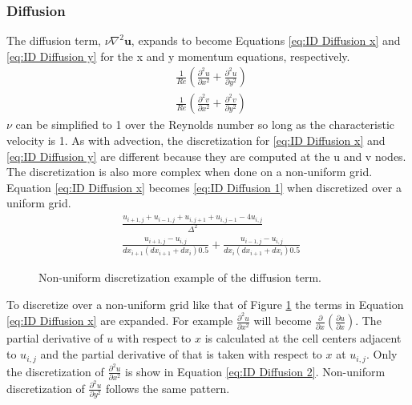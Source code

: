\subsubsection{Diffusion}
\label{sec:NS ID Diffusion}
The diffusion term, $\nu \nabla^2 \textbf{u}$, expands to become Equations \eqref{eq:ID Diffusion x} and \eqref{eq:ID Diffusion y} for the x and y momentum equations, respectively.
\begin{align}
& \frac{1}{Re}\left(\frac{\partial^2 u}{\partial x^2} + \frac{\partial^2 u}{\partial y^2}\right)\label{eq:ID Diffusion x} \\
& \frac{1}{Re}\left(\frac{\partial^2 v}{\partial x^2} + \frac{\partial^2 v}{\partial y^2}\right)\; \label{eq:ID Diffusion y}
\end{align}
$\nu$ can be simplified to 1 over the Reynolds number so long as the characteristic velocity is 1. 
As with advection, the discretization for \eqref{eq:ID Diffusion x} and \eqref{eq:ID Diffusion y} are different because they are computed at the u and v nodes.
The discretization is also more complex when done on a non-uniform grid.
Equation \eqref{eq:ID Diffusion x} becomes \eqref{eq:ID Diffusion 1} when discretized over a uniform grid. 
\begin{align}
&\frac{u_{i+1,j} + u_{i-1,j} + u_{i,j+1} + u_{i,j-1} - 4u_{i,j}}{\Delta^2}\label{eq:ID Diffusion 1} \\
&\frac{u_{i+1,j} - u_{i,j}}{dx_{i+1}(dx_{i+1}+dx_i)0.5} + \frac{u_{i-1,j} - u_{i,j}}{dx_{i}(dx_{i+1}+dx_i)0.5} \; \label{eq:ID Diffusion 2}
\end{align}
\begin{figure}[!htb]
	\centering
	
	\caption{Non-uniform discretization example of the diffusion term.}
	\label{fig:ID diffusion}
\end{figure}
To discretize over a non-uniform grid like that of Figure \ref{fig:ID diffusion} the terms in Equation \eqref{eq:ID Diffusion x} are expanded. 
For example $\frac{\partial^2 u}{\partial x^2}$ will become $\frac{\partial}{\partial x}\left(\frac{\partial u}{\partial x}\right)$. 
The partial derivative of $u$ with respect to $x$ is calculated at the cell centers adjacent to $u_{i,j}$ and the partial derivative of that is taken with respect to $x$ at $u_{i,j}.$
Only the discretization of $\frac{\partial^2 u}{\partial x^2}$ is show in Equation \eqref{eq:ID Diffusion 2}. 
Non-uniform discretization of $\frac{\partial^2 u}{\partial y^2}$ follows the same pattern. 

